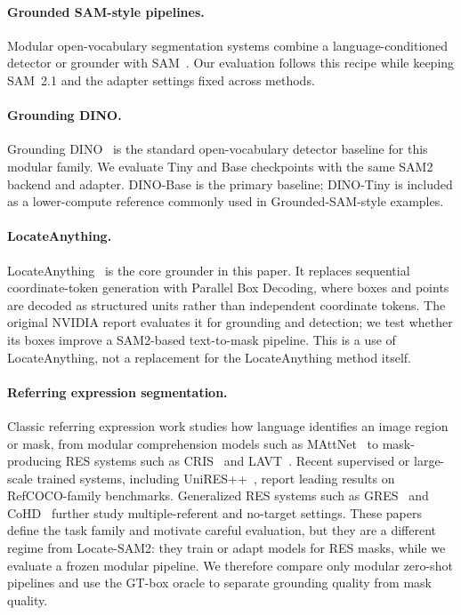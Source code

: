 \documentclass[11pt,a4paper]{article}
\begin{document}
\paragraph{Grounded SAM-style pipelines.}
Modular open-vocabulary segmentation systems combine a language-conditioned detector or grounder with SAM~\cite{ren2024groundedsam}.
Our evaluation follows this recipe while keeping SAM~2.1 and the adapter settings fixed across methods.

\paragraph{Grounding DINO.}
Grounding DINO~\cite{liu2023groundingdino} is the standard open-vocabulary detector baseline for this modular family.
We evaluate Tiny and Base checkpoints with the same SAM2 backend and adapter.
DINO-Base is the primary baseline; DINO-Tiny is included as a lower-compute reference commonly used in Grounded-SAM-style examples.

\paragraph{LocateAnything.}
LocateAnything~\cite{wang2026locateanything} is the core grounder in this paper.
It replaces sequential coordinate-token generation with Parallel Box Decoding, where boxes and points are decoded as structured units rather than independent coordinate tokens.
The original NVIDIA report evaluates it for grounding and detection; we test whether its boxes improve a SAM2-based text-to-mask pipeline.
This is a use of LocateAnything, not a replacement for the LocateAnything method itself.

\paragraph{Referring expression segmentation.}
Classic referring expression work studies how language identifies an image region or mask, from modular comprehension models such as MAttNet~\cite{yu2018mattnet} to mask-producing RES systems such as CRIS~\cite{wang2022cris} and LAVT~\cite{yang2022lavt}.
Recent supervised or large-scale trained systems, including UniRES++~\cite{liu2025unirespp}, report leading results on RefCOCO-family benchmarks.
Generalized RES systems such as GRES~\cite{liu2023gres} and CoHD~\cite{luo2025cohd} further study multiple-referent and no-target settings.
These papers define the task family and motivate careful evaluation, but they are a different regime from Locate-SAM2: they train or adapt models for RES masks, while we evaluate a frozen modular pipeline.
We therefore compare only modular zero-shot pipelines and use the GT-box oracle to separate grounding quality from mask quality.
\end{document}
